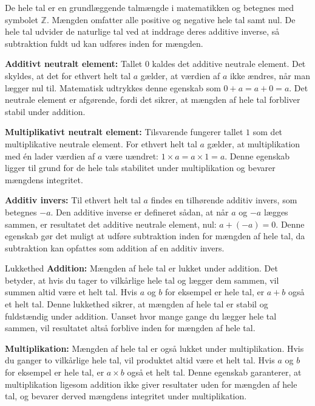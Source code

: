 De hele tal er en grundlæggende talmængde i matematikken og betegnes med symbolet $\mathbb{Z}$. Mængden omfatter alle positive og negative hele tal samt nul. De hele tal udvider de naturlige tal ved at inddrage deres additive inverse, så subtraktion fuldt ud kan udføres inden for mængden.

\textbf{Additivt neutralt element:} Tallet \(0\) kaldes det additive neutrale element. Det skyldes, at det for ethvert helt tal \(a\) gælder, at værdien af \(a\) ikke ændres, når man lægger nul til. Matematisk udtrykkes denne egenskab som \(0 + a = a + 0 = a\). Det neutrale element er afgørende, fordi det sikrer, at mængden af hele tal forbliver stabil under addition.
    
 \textbf{Multiplikativt neutralt element:} Tilsvarende fungerer tallet \(1\) som det multiplikative neutrale element. For ethvert helt tal \(a\) gælder, at multiplikation med én lader værdien af \(a\) være uændret: \(1 \times a = a \times 1 = a\). Denne egenskab ligger til grund for de hele tals stabilitet under multiplikation og bevarer mængdens integritet.
    
\textbf{Additiv invers:} Til ethvert helt tal \(a\) findes en tilhørende additiv invers, som betegnes \(-a\). Den additive inverse er defineret sådan, at når \(a\) og \(-a\) lægges sammen, er resultatet det additive neutrale element, nul: \(a + (-a) = 0\). Denne egenskab gør det muligt at udføre subtraktion inden for mængden af hele tal, da subtraktion kan opfattes som addition af en additiv invers.

\begin{custombox}{Lukkethed}
    \textbf{Addition:} Mængden af hele tal er lukket under addition. Det betyder, at hvis du tager to vilkårlige hele tal og lægger dem sammen, vil summen altid være et helt tal. Hvis \(a\) og \(b\) for eksempel er hele tal, er \(a + b\) også et helt tal. Denne lukkethed sikrer, at mængden af hele tal er stabil og fuldstændig under addition. Uanset hvor mange gange du lægger hele tal sammen, vil resultatet altså forblive inden for mængden af hele tal.

\textbf{Multiplikation:} Mængden af hele tal er også lukket under multiplikation. Hvis du ganger to vilkårlige hele tal, vil produktet altid være et helt tal. Hvis \(a\) og \(b\) for eksempel er hele tal, er \(a \times b\) også et helt tal. Denne egenskab garanterer, at multiplikation ligesom addition ikke giver resultater uden for mængden af hele tal, og bevarer derved mængdens integritet under multiplikation.

\end{custombox}

